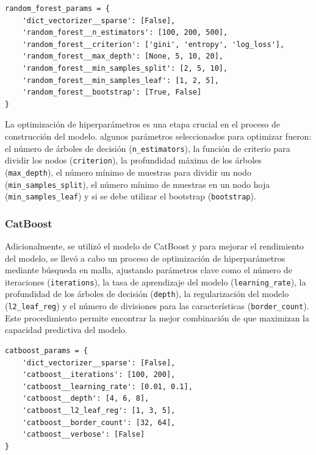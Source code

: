 \documentclass[11pt,a4paper,spanish]{book}
\numberwithin{equation}{chapter}
\numberwithin{figure}{chapter}
\begin{document}
\vspace{5mm}
\begin{lstlisting}
random_forest_params = {
    'dict_vectorizer__sparse': [False],
    'random_forest__n_estimators': [100, 200, 500],   
    'random_forest__criterion': ['gini', 'entropy', 'log_loss'],
    'random_forest__max_depth': [None, 5, 10, 20],
    'random_forest__min_samples_split': [2, 5, 10],
    'random_forest__min_samples_leaf': [1, 2, 5],
    'random_forest__bootstrap': [True, False]
}
\end{lstlisting}

La optimización de hiperparámetros es una etapa crucial en el proceso de construcción 
del modelo. algunos parámetros seleccionados para optimizar fueron: el número de árboles 
de decisión (\lstinline|n_estimators|), la función de criterio para dividir los nodos 
(\lstinline|criterion|), la profundidad máxima de los árboles (\lstinline|max_depth|), 
el número mínimo de muestras para dividir un nodo (\lstinline|min_samples_split|), el 
número mínimo de muestras en un nodo hoja (\lstinline|min_samples_leaf|) y si se debe 
utilizar el bootstrap (\lstinline|bootstrap|). 


\subsubsection{CatBoost}

Adicionalmente, se utilizó el modelo de CatBoost y para mejorar el rendimiento del 
modelo, se llevó a cabo un proceso de optimización de hiperparámetros mediante búsqueda 
en malla, ajustando parámetros clave como el número de iteraciones (\lstinline|iterations|),
la tasa de aprendizaje del modelo (\lstinline|learning_rate|), la profundidad de los 
árboles de decisión (\lstinline|depth|), la regularización del modelo 
(\lstinline|l2_leaf_reg|) y el número de divisiones para las características 
(\lstinline|border_count|). Este procedimiento permite encontrar la mejor combinación de 
que maximizan la capacidad predictiva del modelo.


\vspace{5mm}
\begin{lstlisting}
catboost_params = {
    'dict_vectorizer__sparse': [False],
    'catboost__iterations': [100, 200],
    'catboost__learning_rate': [0.01, 0.1],
    'catboost__depth': [4, 6, 8],
    'catboost__l2_leaf_reg': [1, 3, 5],
    'catboost__border_count': [32, 64],
    'catboost__verbose': [False]
}
\end{lstlisting}
\end{document}

